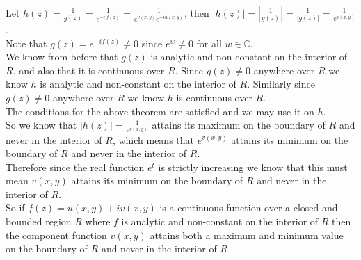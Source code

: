 \documentclass{article}
\begin{document}
\begin{center}
    \doublespacing
    Let $h(z) =\frac{1}{g(z)} =\frac{1}{e^{-i\:f(z)}} =\frac{1}{e^{v(x, y)}e^{-iu(x, y)}}$, then $|h(z)| = |\frac{1}{g(z)}| =\frac{1}{|g(z)|} =\frac{1}{e^{v(x, y)}}$.
    \\Note that $g(z) = e^{-if(z)}\neq 0$ since $e^w\neq 0$ for all $w\in\mathbb{C}$.
    \\We know from before that $g(z)$ is analytic and non-constant on the interior of $R$, and also that it is continuous over $R$. Since $g(z)\neq 0$ anywhere over $R$ we know $h$ is analytic and non-constant on the interior of $R$. Similarly since $g(z)\neq 0$ anywhere over $R$ we know $h$ is continuous over $R$.
    \\The conditions for the above theorem are satisfied and we may use it on $h$.
    \break
    \\So we know that $|h(z)| =\frac{1}{e^{v(x, y)}}$ attains its maximum on the boundary of $R$ and never in the interior of $R$, which means that $e^{v(x, y)}$ attains its minimum on the boundary of $R$ and never in the interior of $R$.
    \\Therefore since the real function $e^t$ is strictly increasing we know that this must mean $v(x, y)$ attains its minimum on the boundary of $R$ and never in the interior of $R$.
    \break
    \\So if $f(z) = u(x, y) + iv(x, y)$ is a continuous function over a closed and bounded region $R$ where $f$ is analytic and non-constant on the interior of $R$ then the component function $v(x, y)$ attains both a maximum and minimum value on the boundary of $R$ and never in the interior of $R$ \qedsymbol
\end{center}


\newpage
\end{document}
